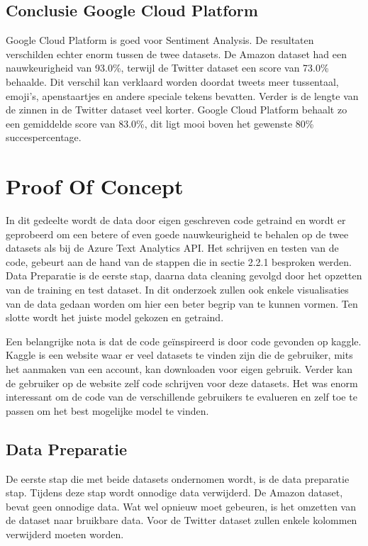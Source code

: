 \subsection{Conclusie Google Cloud Platform}
\label{conclusieGoogleCloudPlatform}

Google Cloud Platform is goed voor Sentiment Analysis. De resultaten verschilden echter enorm tussen de twee datasets. De Amazon dataset had een nauwkeurigheid van 93.0\%, terwijl de Twitter dataset een score van 73.0\% behaalde. Dit verschil kan verklaard worden doordat tweets meer tussentaal, emoji's, apenstaartjes en andere speciale tekens bevatten. Verder is de lengte van de zinnen in de Twitter dataset veel korter. Google Cloud Platform behaalt zo een gemiddelde score van 83.0\%, dit ligt mooi boven het gewenste 80\% succespercentage.


\section{Proof Of Concept}

In dit gedeelte wordt de data door eigen geschreven code getraind en wordt er geprobeerd om een betere of even goede nauwkeurigheid te behalen op de twee datasets als bij de Azure Text Analytics API. Het schrijven en testen van de code, gebeurt aan de hand van de stappen die in sectie 2.2.1 besproken werden. Data Preparatie is de eerste stap, daarna data cleaning gevolgd door het opzetten van de training en test dataset. In dit onderzoek zullen ook enkele visualisaties van de data gedaan worden om hier een beter begrip van te kunnen vormen. Ten slotte wordt het juiste model gekozen en getraind. 

Een belangrijke nota is dat de code geïnspireerd is door code gevonden op kaggle. Kaggle is een website waar er veel datasets te vinden zijn die de gebruiker, mits het aanmaken van een account, kan downloaden voor eigen gebruik. Verder kan de gebruiker op de website zelf code schrijven voor deze datasets. Het was enorm interessant om de code van de verschillende gebruikers te evalueren en zelf toe te passen om het best mogelijke model te vinden. \autocite{Kaggle2021}

\subsection{Data Preparatie}
\label{proofofconceptdatapreparatie}
De eerste stap die met beide datasets ondernomen wordt, is de data preparatie stap. Tijdens deze stap wordt onnodige data verwijderd. De Amazon dataset, bevat geen onnodige data. Wat wel opnieuw moet gebeuren, is het omzetten van de dataset naar bruikbare data. Voor de Twitter dataset zullen enkele kolommen verwijderd moeten worden.

